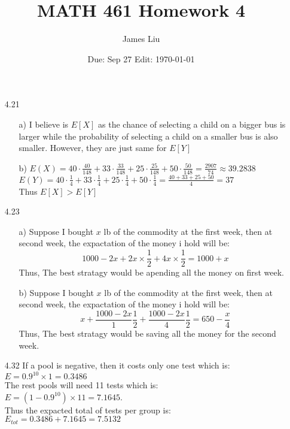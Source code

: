 \documentclass{article}
\date{Due: Sep 27  Edit: \today}
\title{MATH 461 Homework 4}
\author{James Liu}
\begin{document}
\maketitle
\begin{itemize}
    \item [4.21]
    \begin{itemize}
        \item [a)]  I believe is \(E[X]\) as the chance of selecting a child on a bigger bus is larger while the probability of selecting a child on a smaller bus is also smaller. However, they are just same for \(E[Y]\)
        \item [b)]  \(E(X) = 40\cdot\frac{40}{148}+33\cdot\frac{33}{148}+25\cdot\frac{25}{148}+50\cdot\frac{50}{148} =  \frac{2907}{74}\approx 39.2838\)\\
                    \(E(Y) = 40\cdot\frac{1}{4}+33\cdot\frac{1}{4}+25\cdot\frac{1}{4}+50\cdot\frac{1}{4} = \frac{40+33+25+50}{4}=37\)
                   \\ Thus \(E[X]>E[Y]\)
    \end{itemize}
    \item [4.23]
    \begin{itemize}
        \item [a)] Suppose I bought \(x\) lb of the commodity at the first week, then at second week, the expactation of the money i hold will be:
                    \[1000-2x+2x\times\frac{1}{2} + 4x\times \frac{1}{2} = 1000+x\]
                    Thus, The best stratagy would be apending all the money on first week.
        \item [b)] Suppose I bought \(x\) lb of the commodity at the first week, then at second week, the expactation of the money i hold will be:
                    \[x + \frac{1000-2x}{1}\frac{1}{2}+\frac{1000-2x}{4}\frac{1}{2} = 650 - \frac{x}{4}\]
                    Thus, The best stratagy would be saving all the money for the second week.
    \end{itemize}
    \item [4.32] If a pool is negative, then it costs only one test which is:\\  \(E = 0.9^{10}\times 1 = 0.3486\)
                  \\ The rest pools will need 11 tests which is: \\ \(E = (1-0.9^{10})\times 11 = 7.1645\).\\
                  Thus the expacted total of tests per group is:\\ \(E_{tot}=0.3486+7.1645 = 7.5132\)

\end{itemize}
\end{document}

